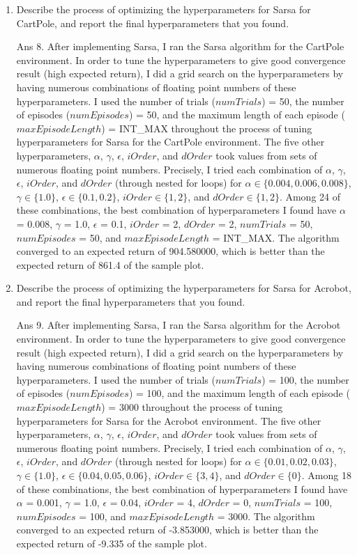 \documentclass[]{article}
\begin{document}
\begin{enumerate}
    \item Describe the process of optimizing the hyperparameters for Sarsa for CartPole, and report the final hyperparameters that you found.

	{
		\color{blue}
		Ans 8. After implementing Sarsa, I ran the Sarsa algorithm for the CartPole environment. In order to tune the hyperparameters to give good convergence result (high expected return), I did a grid search on the hyperparameters by having numerous combinations of floating point numbers of these hyperparameters. I used the number of trials ($numTrials$) = 50, the number of episodes ($numEpisodes$) = 50, and the maximum length of each episode ($maxEpisodeLength$) = INT\_MAX throughout the process of tuning hyperparameters for Sarsa for the CartPole environment. The five other hyperparameters, $\alpha$, $\gamma$, $\epsilon$, $iOrder$, and $dOrder$ took values from sets of numerous floating point numbers. Precisely, I tried each combination of $\alpha$, $\gamma$, $\epsilon$, $iOrder$, and $dOrder$ (through nested for loops) for $\alpha \in \{0.004, 0.006, 0.008\}$, $\gamma \in \{1.0\}$, $\epsilon \in \{0.1, 0.2\}$, $iOrder \in \{1, 2\}$, and $dOrder \in \{1, 2\}$. Among 24 of these combinations, the best combination of hyperparameters I found have $\alpha$ = 0.008, $\gamma$ = 1.0, $\epsilon$ = 0.1, $iOrder$ = 2, $dOrder$ =  2, $numTrials$ = 50, $numEpisodes$ = 50, and $maxEpisodeLength$ = INT\_MAX. The algorithm converged to an expected return of 904.580000, which is better than the expected return of 861.4 of the sample plot.

	}

    \item Describe the process of optimizing the hyperparameters for Sarsa for Acrobot, and report the final hyperparameters that you found.

	{
		\color{blue}
		Ans 9. After implementing Sarsa, I ran the Sarsa algorithm for the Acrobot environment. In order to tune the hyperparameters to give good convergence result (high expected return), I did a grid search on the hyperparameters by having numerous combinations of floating point numbers of these hyperparameters. I used the number of trials ($numTrials$) = 100, the number of episodes ($numEpisodes$) = 100, and the maximum length of each episode ($maxEpisodeLength$) = 3000 throughout the process of tuning hyperparameters for Sarsa for the Acrobot environment. The five other hyperparameters, $\alpha$, $\gamma$, $\epsilon$, $iOrder$, and $dOrder$ took values from sets of numerous floating point numbers. Precisely, I tried each combination of $\alpha$, $\gamma$, $\epsilon$, $iOrder$, and $dOrder$ (through nested for loops) for $\alpha \in \{0.01, 0.02, 0.03\}$, $\gamma \in \{1.0\}$, $\epsilon \in \{0.04, 0.05, 0.06\}$, $iOrder \in \{3, 4\}$, and $dOrder \in \{0\}$. Among 18 of these combinations, the best combination of hyperparameters I found have $\alpha$ = 0.001, $\gamma$ = 1.0, $\epsilon$ = 0.04, $iOrder$ = 4, $dOrder$ =  0, $numTrials$ = 100, $numEpisodes$ = 100, and $maxEpisodeLength$ = 3000. The algorithm converged to an expected return of -3.853000, which is better than the expected return of -9.335 of the sample plot.
	}


\end{enumerate}
\end{document}
